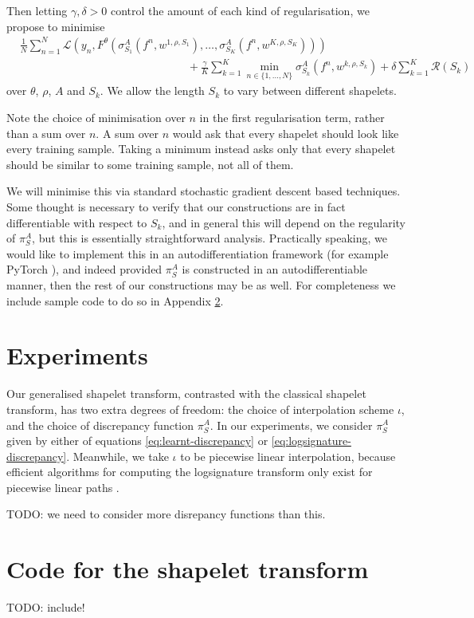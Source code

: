 \documentclass{article}
\theoremstyle{plain}
\theoremstyle{definition}
\begin{document}
	Then letting $\gamma, \delta > 0$ control the amount of each kind of regularisation, we propose to minimise
	\newcommand{\objective}{&\frac{1}{N}\sum_{n = 1}^N \mathcal{L}(y_n, F^\theta(\sigma^A_{S_1}(f^n, w^{1, \rho, S_1}), \ldots, \sigma^A_{S_K}(f^n, w^{K, \rho, S_K})))\nonumber\\[-10pt]
	&\hspace{15em} + \frac{\gamma}{K} \sum_{k = 1}^K \min_{n \in \{1, \ldots, N\}} \sigma^A_{S_k}(f^n, w^{k, \rho, S_k}) + \delta \sum_{k = 1}^K\mathcal{R}(S_k)}
	\begin{align}
	\objective \label{eq:objective}
	\end{align}
	over $\theta$, $\rho$, $A$ and $S_k$. We allow the length $S_k$ to vary between different shapelets.
	
	Note the choice of minimisation over $n$ in the first regularisation term, rather than a sum over $n$. A sum over $n$ would ask that every shapelet should look like every training sample. Taking a minimum instead asks only that every shapelet should be similar to some training sample, not all of them.
	
	We will minimise this via standard stochastic gradient descent based techniques. Some thought is necessary to verify that our constructions are in fact differentiable with respect to $S_k$, and in general this will depend on the regularity of $\pi^A_S$, but this is essentially straightforward analysis. Practically speaking, we would like to implement this in an autodifferentiation framework (for example PyTorch \cite{pytorch}), and indeed provided $\pi^A_S$ is constructed in an autodifferentiable manner, then the rest of our constructions may be as well. For completeness we include sample code to do so in Appendix \ref{appendix:code}.
	
	\section{Experiments}
	Our generalised shapelet transform, contrasted with the classical shapelet transform, has two extra degrees of freedom: the choice of interpolation scheme $\iota$, and the choice of discrepancy function $\pi^A_S$. In our experiments, we consider $\pi^A_S$ given by either of equations \eqref{eq:learnt-discrepancy} or \eqref{eq:logsignature-discrepancy}. Meanwhile, we take $\iota$ to be piecewise linear interpolation, because efficient algorithms for computing the logsignature transform only exist for piecewise linear paths \cite{signatory}.
	
	TODO: we need to consider more disrepancy functions than this.
	
	\appendix
	\section{Code for the shapelet transform}\label{appendix:code}
	TODO: include!
	
\end{document}
